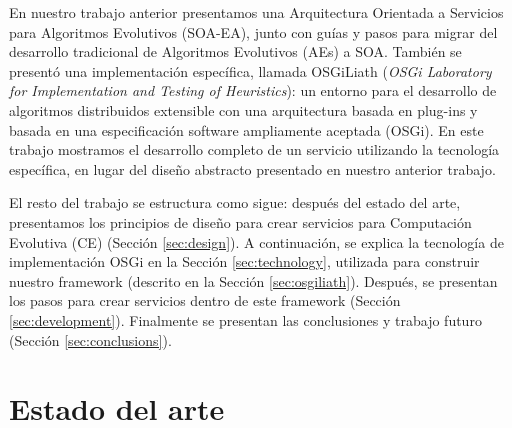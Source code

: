 \documentclass[runningheads]{llncs}
\begin{document}

En nuestro trabajo anterior \cite{OSGILIATH} presentamos una
Arquitectura Orientada a Servicios para Algoritmos Evolutivos
(SOA-EA), junto con guías y pasos para migrar del desarrollo
tradicional de Algoritmos Evolutivos (AEs) a SOA. También se presentó
una implementación específica, llamada OSGiLiath ({\em OSGi Laboratory
  for Implementation and Testing of Heuristics}): un entorno para el
desarrollo de algoritmos distribuidos extensible con una arquitectura
basada en plug-ins y basada en una especificación software ampliamente
aceptada (OSGi). En este trabajo mostramos el desarrollo completo de
un servicio utilizando la tecnología específica, en lugar del diseño
abstracto presentado en nuestro anterior trabajo. %

El resto del trabajo se estructura como sigue: después del estado del
arte, presentamos los principios de diseño para crear servicios para
Computación Evolutiva (CE) (Sección \ref{sec:design}). A continuación,
se explica la tecnología de implementación OSGi en la Sección
\ref{sec:technology}, utilizada para construir nuestro framework
(descrito en la Sección \ref{sec:osgiliath}). Después, se presentan
los pasos para crear servicios dentro de este framework (Sección
\ref{sec:development}). Finalmente se presentan las conclusiones y
trabajo futuro (Sección \ref{sec:conclusions}). %



\section{Estado del arte}
\label{sec:soa}
\end{document}
